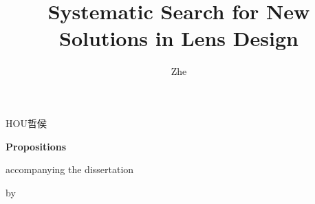 \documentclass{dissertation}
\begin{document}
\title{Systematic Search for New Solutions in Lens Design}
\author{Zhe}{HOU}{哲}{侯}

\begin{center}

{\Large\titlefont\bfseries Propositions}

\bigskip

accompanying the dissertation

\bigskip

{\makeatletter
\titlestyle\bfseries\large\@title
\makeatother}


{\makeatletter
\ifx\@subtitle\undefined\else
    \titlefont\titleshape\@subtitle
\fi
\makeatother}


\bigskip

by

\bigskip

\makeatletter
{\large\titlefont\bfseries\@firstname\ {\titleshape\@lastname}}
\makeatother

\end{center}

\bigskip
\bigskip
\end{document}
